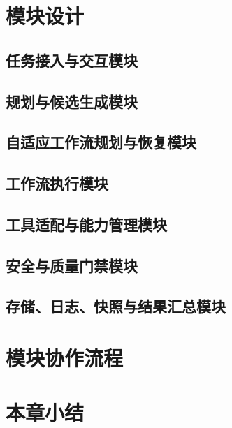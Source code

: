 
\section{模块设计}

\subsection{任务接入与交互模块}
\subsection{规划与候选生成模块}
\subsection{自适应工作流规划与恢复模块}
\subsection{工作流执行模块}
\subsection{工具适配与能力管理模块}
\subsection{安全与质量门禁模块}
\subsection{存储、日志、快照与结果汇总模块}

\section{模块协作流程}


\section{本章小结}

